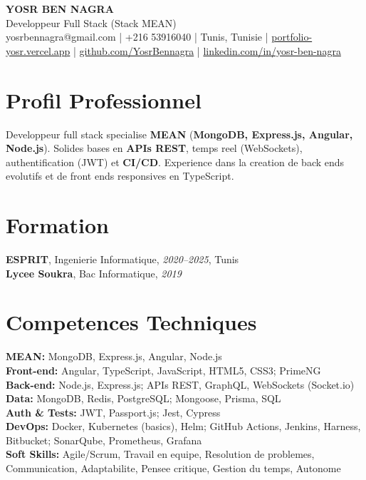 \documentclass[10pt,a4paper]{article}
\begin{document}
\begin{center}
  {\Large\bfseries YOSR BEN NAGRA}\\[2pt]
  {\small Developpeur Full Stack (Stack MEAN)}\\[3pt]
  {\footnotesize yosrbennagra@gmail.com \;|\; +216 53916040 \;|\; Tunis, Tunisie \;|\; \href{https://portfolio-yosr.vercel.app/en}{portfolio-yosr.vercel.app} \;|\; \href{https://github.com/YosrBennagra}{github.com/YosrBennagra} \;|\; \href{https://www.linkedin.com/in/yosr-ben-nagra/}{linkedin.com/in/yosr-ben-nagra}}
\end{center}

\section*{Profil Professionnel}
{\small
Developpeur full stack specialise \textbf{MEAN} (\textbf{MongoDB, Express.js, Angular, Node.js}). Solides bases en \textbf{APIs REST}, temps reel (WebSockets), authentification (JWT) et \textbf{CI/CD}. Experience dans la creation de back ends evolutifs et de front ends responsives en TypeScript.
}

\vspace{4pt}

\section*{Formation}
{\small
\textbf{ESPRIT}, Ingenierie Informatique, \textit{2020--2025}, Tunis\\[1pt]
\textbf{Lycee Soukra}, Bac Informatique, \textit{2019}
}

\vspace{4pt}

\section*{Competences Techniques}
{\small
\textbf{MEAN:} MongoDB, Express.js, Angular, Node.js\\[2pt]
\textbf{Front-end:} Angular, TypeScript, JavaScript, HTML5, CSS3; PrimeNG\\[2pt]
\textbf{Back-end:} Node.js, Express.js; APIs REST, GraphQL, WebSockets (Socket.io)\\[2pt]
\textbf{Data:} MongoDB, Redis, PostgreSQL; Mongoose, Prisma, SQL\\[2pt]
\textbf{Auth \& Tests:} JWT, Passport.js; Jest, Cypress\\[2pt]
\textbf{DevOps:} Docker, Kubernetes (basics), Helm; GitHub Actions, Jenkins, Harness, Bitbucket; SonarQube, Prometheus, Grafana\\[2pt]
\textbf{Soft Skills:} Agile/Scrum, Travail en equipe, Resolution de problemes, Communication, Adaptabilite, Pensee critique, Gestion du temps, Autonome
}
\end{document}
